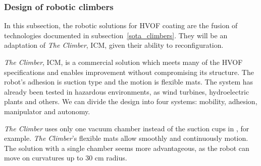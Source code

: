 \subsubsection{Design of robotic climbers}\label{proj_climbers}
In this subsection, the robotic solutions for HVOF coating are the fusion
of technologies documented in subsection~\ref{sota_climbers}. They will be an
adaptation of \emph{The Climber}, ICM, given their ability to reconfiguration.


\emph{The Climber}, ICM, is a commercial solution which meets many
of the HVOF specifications and enables improvement without compromising its
structure. The robot's adhesion is suction type and the motion is flexible
mats.
The system has already been tested in hazardous environments, as wind turbines,
hydroelectric plants and others. We can divide the design into four systems:
mobility, adhesion, manipulator and autonomy.


\emph{The Climber} uses only one vacuum chamber instead of the suction cups in
\cite{kim2008development}, for example. \emph{The Climber}'s flexible mats allow
smoothly and continuously motion. The solution with a single chamber seems more
advantageous, as the robot can move on curvatures up to 30 cm radius.



